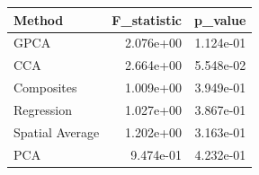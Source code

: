 \begin{tabular}{lrr}
\toprule
Method & F_statistic & p_value \\
\midrule
GPCA & 2.076e+00 & 1.124e-01 \\
CCA & 2.664e+00 & 5.548e-02 \\
Composites & 1.009e+00 & 3.949e-01 \\
Regression & 1.027e+00 & 3.867e-01 \\
Spatial Average & 1.202e+00 & 3.163e-01 \\
PCA & 9.474e-01 & 4.232e-01 \\
\bottomrule
\end{tabular}
